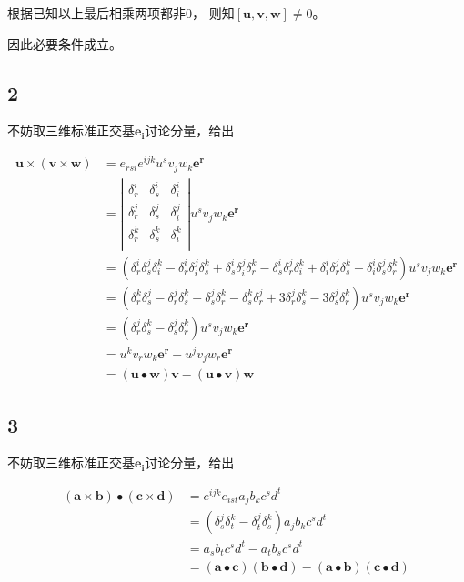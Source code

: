 \documentclass[UTF8,c5size]{ctexart}
\begin{document}
根据已知以上最后相乘两项都非0，
则知$[\bm{u},\bm{v},\bm{w}]\neq 0$。

因此必要条件成立。

\subsection*{2}

不妨取三维标准正交基$\bm{e_i}$讨论分量，给出

\begin{equation*}
    \begin{split}
        \bm{u}\times(\bm{v}\times\bm{w})&=
        e_{rsi}e^{ijk}u^sv_jw_k\bm{e^r}\\
        &=
        \left|
        \begin{matrix}
            \delta^i_r&\delta^i_s&\delta^i_i\\
            \delta^j_r&\delta^j_s&\delta^j_i\\
            \delta^k_r&\delta^k_s&\delta^k_i\\
        \end{matrix}
        \right|u^sv_jw_k\bm{e^r}\\
        &=
        (\delta^i_r\delta^j_s\delta^k_i-\delta^i_r\delta^j_i\delta^k_s
        +\delta^i_s\delta^j_i\delta^k_r-\delta^i_s\delta^j_r\delta^k_i
        +\delta^i_i\delta^j_r\delta^k_s-\delta^i_i\delta^j_s\delta^k_r)
        u^sv_jw_k\bm{e^r}\\
        &=
        (\delta^k_r\delta^j_s-\delta^j_r\delta^k_s
        +\delta^j_s\delta^k_r-\delta^k_s\delta^j_r
        +3\delta^j_r\delta^k_s-3\delta^j_s\delta^k_r)
        u^sv_jw_k\bm{e^r}\\
        &=
        (\delta^j_r\delta^k_s-\delta^j_s\delta^k_r)
        u^sv_jw_k\bm{e^r}\\
        &=u^kv_rw_k\bm{e^r}-u^jv_jw_r\bm{e^r}\\
        &=(\bm{u}\bullet\bm{w})\bm{v}-(\bm{u}\bullet\bm{v})\bm{w}
    \end{split}
\end{equation*}

\subsection*{3}

不妨取三维标准正交基$\bm{e_i}$讨论分量，给出

\begin{equation*}
    \begin{split}
        (\bm{a}\times\bm{b})\bullet(\bm{c}\times\bm{d})&=
        e^{ijk}e_{ist}a_jb_kc^sd^t\\
        &=(\delta^j_s\delta^k_t-\delta^j_t\delta^k_s)a_jb_kc^sd^t\\
        &=a_sb_tc^sd^t-a_tb_sc^sd^t\\
        &=(\bm{a}\bullet\bm{c})(\bm{b}\bullet\bm{d})-
        (\bm{a}\bullet\bm{b})(\bm{c}\bullet\bm{d})
    \end{split}
\end{equation*}
\end{document}
